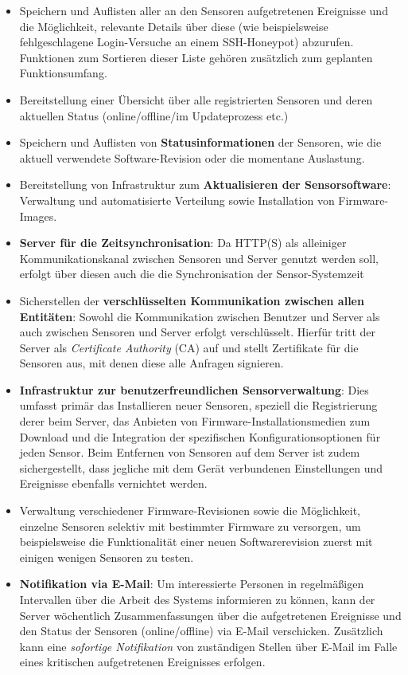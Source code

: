 \documentclass[12pt]{article}
\begin{document}
\begin{itemize}
				\item Speichern und Auflisten aller an den Sensoren aufgetretenen Ereignisse und die Möglichkeit, relevante Details über diese (wie beispielsweise fehlgeschlagene Login-Versuche an einem SSH-Honeypot) abzurufen. Funktionen zum Sortieren dieser Liste gehören zusätzlich zum geplanten Funktionsumfang.
				\item Bereitstellung einer Übersicht über alle registrierten Sensoren und deren aktuellen Status (online/offline/im Updateprozess etc.)
				\item Speichern und Auflisten von \textbf{Statusinformationen} der Sensoren, wie die aktuell verwendete Soft\-ware-Revision oder die momentane Auslastung.
				\item Bereitstellung von Infrastruktur zum \textbf{Aktualisieren der Sensorsoftware}: Verwaltung und automatisierte Verteilung sowie Installation von Firmware-Images.
				\item \textbf{Server für die Zeitsynchronisation}: Da HTTP(S) als alleiniger Kommunikationskanal zwischen Sensoren und Server genutzt werden soll, erfolgt über diesen auch die die Synchronisation der Sensor-Systemzeit
				\item Sicherstellen der \textbf{verschlüsselten Kommunikation zwischen allen Entitäten}: Sowohl die Kommunikation zwischen Benutzer und Server als auch zwischen Sensoren und Server erfolgt verschlüsselt. Hierfür tritt der Server als \textit{Certificate Authority} (CA) auf und stellt Zertifikate für die Sensoren aus, mit denen diese alle Anfragen signieren.
				\item \textbf{Infrastruktur zur benutzerfreundlichen Sensorverwaltung}: Dies umfasst primär das Installieren neuer Sensoren, speziell die Registrierung derer beim Server, das Anbieten von Firmware-Installationsmedien zum Download und die Integration der spezifischen Konfigurationsoptionen für jeden Sensor. Beim Entfernen von Sensoren auf dem Server ist zudem sichergestellt, dass jegliche mit dem Gerät verbundenen Einstellungen und Ereignisse ebenfalls vernichtet werden.
				\item Verwaltung verschiedener Firmware-Revisionen sowie die Möglichkeit, einzelne Sensoren selektiv mit bestimmter Firmware zu versorgen, um beispielsweise die Funktionalität einer neuen Softwarerevision zuerst mit einigen wenigen Sensoren zu testen.
				\item \textbf{Notifikation via E-Mail}: Um interessierte Personen in regelmäßigen Intervallen über die Arbeit des Systems informieren zu können, kann der Server wöchentlich Zusammenfassungen über die aufgetretenen Ereignisse und den Status der Sensoren (online/offline) via E-Mail verschicken. Zusätzlich kann eine \textit{sofortige Notifikation} von zuständigen Stellen über E-Mail im Falle eines kritischen aufgetretenen Ereignisses erfolgen.

\end{itemize}
\end{document}
